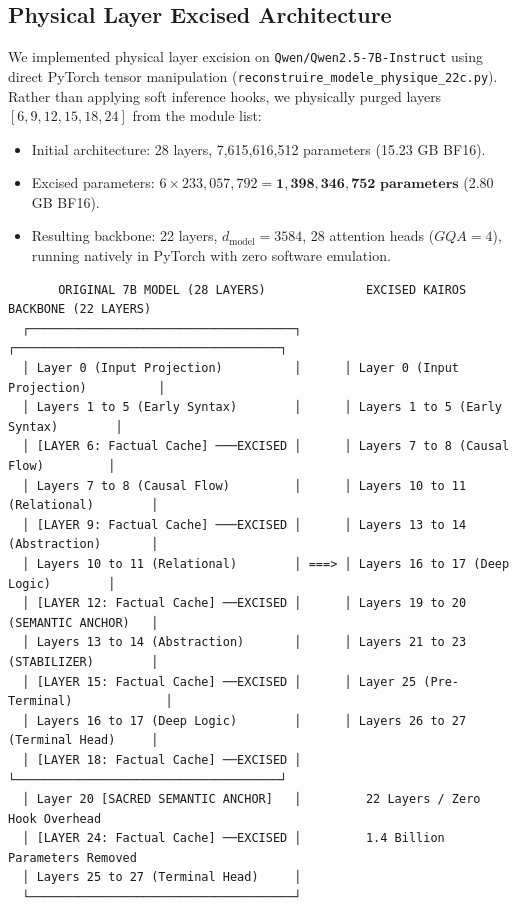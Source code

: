 \documentclass[10pt,twocolumn]{article}
\begin{document}
\subsection{Physical Layer Excised Architecture}

We implemented physical layer excision on \texttt{Qwen/Qwen2.5-7B-Instruct} using direct PyTorch tensor manipulation (\texttt{reconstruire_modele_physique_22c.py}). Rather than applying soft inference hooks, we physically purged layers $[6, 9, 12, 15, 18, 24]$ from the module list:
\begin{itemize}
  \item Initial architecture: 28 layers, 7,615,616,512 parameters (15.23 GB BF16).
  \item Excised parameters: $6 \times 233,057,792 = \mathbf{1,398,346,752 \text{ parameters}}$ (2.80 GB BF16).
  \item Resulting backbone: 22 layers, $d_{\text{model}} = 3584$, 28 attention heads ($GQA=4$), running natively in PyTorch with zero software emulation.
\end{itemize}

\begin{verbatim}
       ORIGINAL 7B MODEL (28 LAYERS)              EXCISED KAIROS BACKBONE (22 LAYERS)
  ┌─────────────────────────────────────┐      ┌─────────────────────────────────────┐
  │ Layer 0 (Input Projection)          │      │ Layer 0 (Input Projection)          │
  │ Layers 1 to 5 (Early Syntax)        │      │ Layers 1 to 5 (Early Syntax)        │
  │ [LAYER 6: Factual Cache] ───EXCISED │      │ Layers 7 to 8 (Causal Flow)         │
  │ Layers 7 to 8 (Causal Flow)         │      │ Layers 10 to 11 (Relational)        │
  │ [LAYER 9: Factual Cache] ───EXCISED │      │ Layers 13 to 14 (Abstraction)       │
  │ Layers 10 to 11 (Relational)        │ ===> │ Layers 16 to 17 (Deep Logic)        │
  │ [LAYER 12: Factual Cache] ──EXCISED │      │ Layers 19 to 20 (SEMANTIC ANCHOR)   │
  │ Layers 13 to 14 (Abstraction)       │      │ Layers 21 to 23 (STABILIZER)        │
  │ [LAYER 15: Factual Cache] ──EXCISED │      │ Layer 25 (Pre-Terminal)             │
  │ Layers 16 to 17 (Deep Logic)        │      │ Layers 26 to 27 (Terminal Head)     │
  │ [LAYER 18: Factual Cache] ──EXCISED │      └─────────────────────────────────────┘
  │ Layer 20 [SACRED SEMANTIC ANCHOR]   │         22 Layers / Zero Hook Overhead
  │ [LAYER 24: Factual Cache] ──EXCISED │         1.4 Billion Parameters Removed
  │ Layers 25 to 27 (Terminal Head)     │
  └─────────────────────────────────────┘
\end{verbatim}
\end{document}
